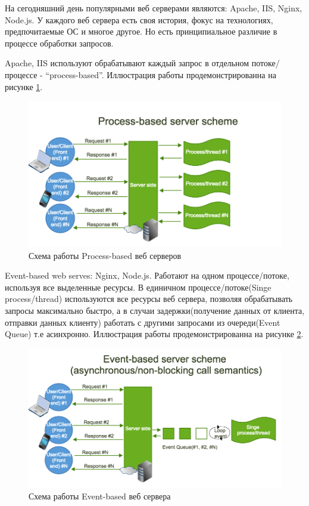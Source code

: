 На сегодняшний день популярными веб серверами являются: Apache, IIS, Nginx,
Node.js. У каждого веб сервера есть своя история, фокус на технологиях,
предпочитаемые ОС и многое другое. Но есть принципиальное различие в процессе
обработки запросов.

Apache, IIS используют обрабатывают каждый запрос в отдельном потоке/процессе -
“process-based”. Иллюстрация работы продемонстрированна на рисунке
\ref{fig:proc-based}.
\begin{figure}[H]
    \centering
    \includegraphics[scale=0.40]{inc/img/process-based-server.png}
    \caption{Схема работы Process-based веб серверов}
    \label{fig:proc-based}
\end{figure}

Event-based web serves: Nginx, Node.js. Работают на одном процессе/потоке,
используя все выделенные ресурсы. В единичном процессе/потоке(Singe
process/thread) используются все ресурсы веб сервера, позволяя обрабатывать
запросы максимально быстро, а в случаи задержки(получение данных от клиента,
отправки данных клиенту) работать с другими запросами из очереди(Event Queue)
т.е асинхронно. Иллюстрация работы продемонстрированна на рисунке
\ref{fig:event-based}.
\begin{figure}[H]
    \centering
    \includegraphics[scale=0.40]{inc/img/event-based-server.png}
    \caption{Схема работы Event-based веб сервера}
    \label{fig:event-based}
\end{figure}

